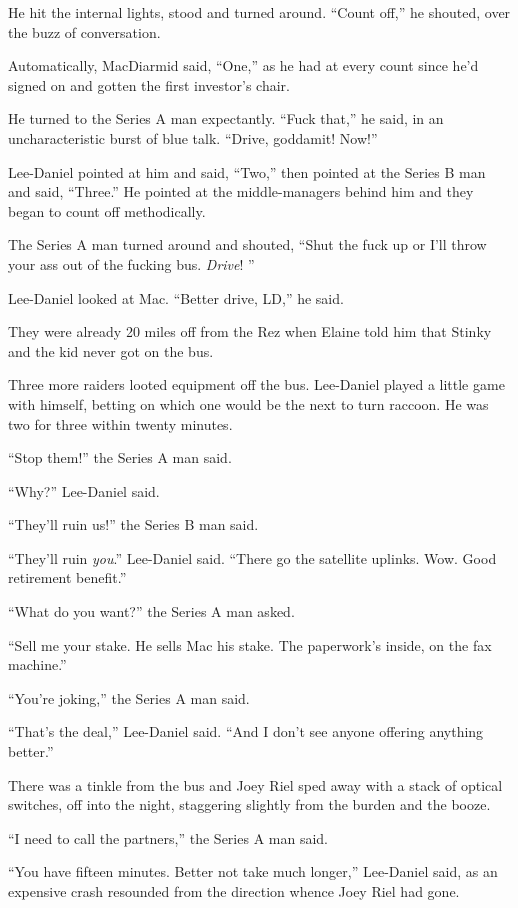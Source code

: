 He hit the internal lights, stood and turned around. “Count off,” 
he shouted, over the buzz of conversation.

Automatically, MacDiarmid said, “One,” as he had at every count 
since he'd signed on and gotten the first investor's chair.

He turned to the Series A man expectantly. “Fuck that,” he said, in 
an uncharacteristic burst of blue talk. “Drive, goddamit! Now!”

Lee-Daniel pointed at him and said, “Two,” then pointed at the 
Series B man and said, “Three.” He pointed at the middle-managers 
behind him and they began to count off methodically.

The Series A man turned around and shouted, “Shut the fuck up or I'll 
throw your ass out of the fucking bus. \emph{Drive}! ”

Lee-Daniel looked at Mac. “Better drive, LD,” he said.

They were already 20 miles off from the Rez when Elaine told him that 
Stinky and the kid never got on the bus.

\tb

Three more raiders looted equipment off the bus. Lee-Daniel played a 
little game with himself, betting on which one would be the next to 
turn raccoon. He was two for three within twenty minutes.

“Stop them!” the Series A man said.

“Why?” Lee-Daniel said.

“They'll ruin us!” the Series B man said.

“They'll ruin \emph{you}.” Lee-Daniel said. “There go the 
satellite uplinks. Wow. Good retirement benefit.”

“What do you want?” the Series A man asked.

“Sell me your stake. He sells Mac his stake. The paperwork's inside, 
on the fax machine.”

“You're joking,” the Series A man said.

“That's the deal,” Lee-Daniel said. “And I don't see anyone 
offering anything better.”

There was a tinkle from the bus and Joey Riel sped away with a stack of 
optical switches, off into the night, staggering slightly from the 
burden and the booze.

“I need to call the partners,” the Series A man said.

“You have fifteen minutes. Better not take much longer,” Lee-Daniel 
said, as an expensive crash resounded from the direction whence Joey 
Riel had gone.


